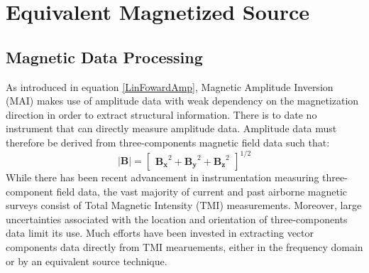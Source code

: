 \graphicspath{{./Figures/}}
\chapter{Equivalent Magnetized Source}
\label{ch:Chap5_Equivalent_Source}

\section{Magnetic Data Processing}
As introduced in equation \ref{LinFowardAmp}, Magnetic Amplitude Inversion (MAI) makes use of amplitude data  with weak dependency on the magnetization direction in order to extract structural information. There is to date no instrument that can directly measure amplitude data. Amplitude data must therefore be derived from three-components magnetic field data such that:
\begin{equation}\label{AmpMagData}
\mathbf{|B|} = 
	\begin{bmatrix}
		\mathbf{B_x}^2 + \mathbf{B_y}^2 + \mathbf{B_z}^2
	\end{bmatrix} ^{1/2} 
\end{equation}
While there has been recent advancement in instrumentation measuring three-component field data, the vast majority of current and past airborne magnetic surveys consist of Total Magnetic Intensity (TMI) measurements.  Moreover, large uncertainties associated with the location and orientation of three-components data limit its use. 
Much efforts have been invested in extracting vector components data directly from TMI mearuements, either in the frequency domain or by an equivalent source technique. 

